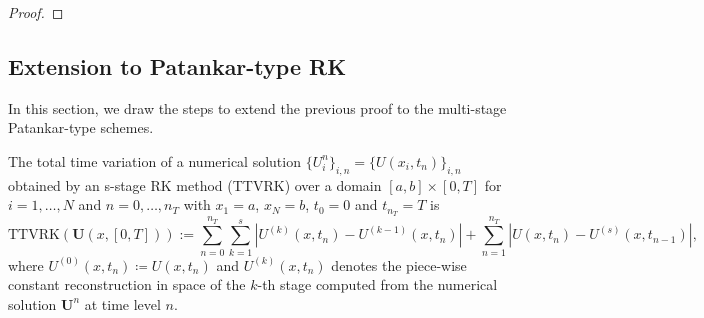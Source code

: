 \documentclass[final,11pt, times, linenumber, nopreprintline]{elsarticle}
\newcommand{\bU}{\bm U}
\begin{document}
\begin{proof}
	
\end{proof}


\subsection{Extension to Patankar-type RK}
In this section, we draw the steps to extend the previous proof to the multi-stage Patankar-type schemes.
\begin{dfn}
	The total time variation of a numerical solution $\lbrace U_i^n \rbrace_{i,n}=\{U(x_i,t_n)\}_{i,n}$ obtained by an s-stage RK method (TTVRK) over a domain $[a,b]\times [0,T]$ for $i=1,\dots,N$ and $n=0,\dots, n_T$ with $x_1=a$, $x_N=b$, $t_0=0$ and $t_{n_T}=T$ is 
    	\begin{equation}
				\text{TTVRK}(\bU(x,[0,T])):=\sum_{n = 0}^{n_T}\sum_{k=1}^s|U^{(k)}(x,t_n) -U^{(k-1)}(x,t_n)| +\sum_{n = 1}^{n_T}|U(x,t_n) -U^{(s)}(x,t_{n-1})|,
	\end{equation}
    where $U^{(0)}(x,t_n)\coloneqq U(x,t_n)$ and $U^{(k)}(x,t_n)$ denotes the piece-wise constant reconstruction in space of the $k$-th stage computed from the numerical solution $\mathbf U^n$ at time level $n$.
\end{dfn}
\end{document}
